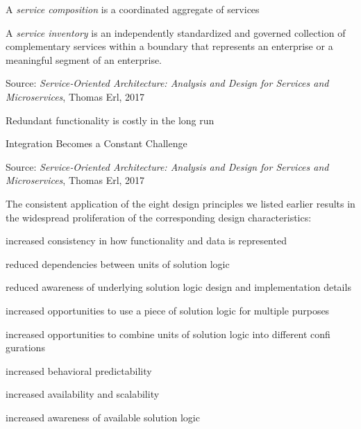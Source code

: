 \documentclass[Screen16to9,17pt]{foils}
\begin{document}
\begin{list2}
\item A \emph{service composition} is a coordinated aggregate of services
\item A \emph{service inventory} is an independently standardized and governed collection of complementary services within a boundary that represents an enterprise or a meaningful segment of an enterprise.
\end{list2}

Source: \emph{Service‑Oriented Architecture: Analysis and Design for Services and Microservices}, Thomas Erl, 2017




\begin{list2}
\item Redundant functionality is costly in the long run
\item Integration Becomes a Constant Challenge
\end{list2}

Source: \emph{Service‑Oriented Architecture: Analysis and Design for Services and Microservices}, Thomas Erl, 2017


The consistent application of the eight design principles we listed earlier results in the widespread proliferation of the corresponding design characteristics:

\begin{list2}
\item increased consistency in how functionality and data is represented
\item reduced dependencies between units of solution logic
\item reduced awareness of underlying solution logic design and implementation details
\item increased opportunities to use a piece of solution logic for multiple purposes
\item increased opportunities to combine units of solution logic into different
confi gurations
\item increased behavioral predictability
\item  increased availability and scalability
\item increased awareness of available solution logic
\end{list2}
\end{document}
